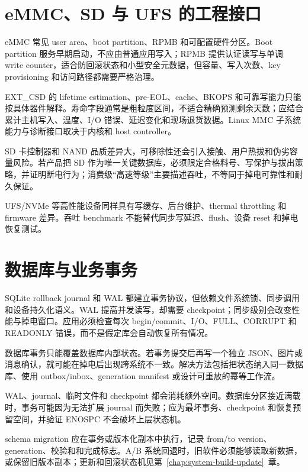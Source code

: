 \section{eMMC、SD 与 UFS 的工程接口}

eMMC 常见 user area、boot partition、RPMB 和可配置硬件分区。Boot partition 服务早期启动，不应由普通应用写入；RPMB 提供认证读写与单调 write counter，适合防回滚状态和小型安全元数据，但容量、写入次数、key provisioning 和访问路径都需要严格治理。

EXT\_CSD 的 lifetime estimation、pre-EOL、cache、BKOPS 和可靠写能力只能按具体器件解释。寿命字段通常是粗粒度区间，不适合精确预测剩余天数；应结合累计主机写入、温度、I/O 错误、延迟变化和现场退货数据。Linux MMC 子系统能力与诊断接口取决于内核和 host controller\cite{linux-mmc-doc}。

SD 卡控制器和 NAND 品质差异大，可移除性还会引入接触、用户热拔和伪劣容量风险。若产品把 SD 作为唯一关键数据库，必须限定合格料号、写保护与拔出策略，并证明断电行为；消费级“高速等级”主要描述吞吐，不等同于掉电可靠性和耐久保证。

UFS/NVMe 等高性能设备同样具有写缓存、后台维护、thermal throttling 和 firmware 差异。吞吐 benchmark 不能替代同步写延迟、flush、设备 reset 和掉电恢复测试。

\section{数据库与业务事务}

SQLite rollback journal 和 WAL 都建立事务协议，但依赖文件系统锁、同步调用和设备持久化语义。WAL 提高并发读写，却需要 checkpoint；同步级别会改变性能与掉电窗口\cite{sqlite-atomic-commit,sqlite-wal}。应用必须检查每次 begin/commit、I/O、FULL、CORRUPT 和 READONLY 错误，而不是假定库会自动恢复所有情况。

数据库事务只能覆盖数据库内部状态。若事务提交后再写一个独立 JSON、图片或消息确认，就可能在掉电后出现跨系统不一致。解决方法包括把状态纳入同一数据库、使用 outbox/inbox、generation manifest 或设计可重放的幂等工作流。

WAL、journal、临时文件和 checkpoint 都会消耗额外空间。数据库分区接近满载时，事务可能因为无法扩展 journal 而失败；应为最坏事务、checkpoint 和恢复预留空间，并验证 ENOSPC 不会破坏上层状态机。

schema migration 应在事务或版本化副本中执行，记录 from/to version、generation、校验和和完成标志。A/B 系统回退时，旧软件必须能够读取新数据，或保留旧版本副本；更新和回滚状态机见\mbox{第~\ref{chap:system-build-update}~章}。

